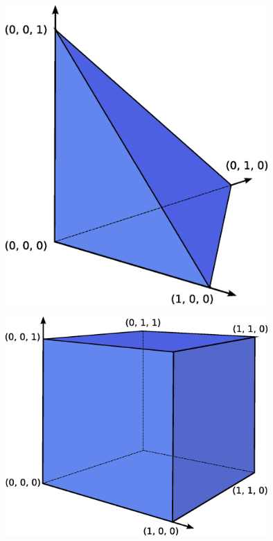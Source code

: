 \includegraphics[width=10cm]{eps/tetrahedron.eps}

\includegraphics[width=10cm]{eps/hexahedron.eps}
